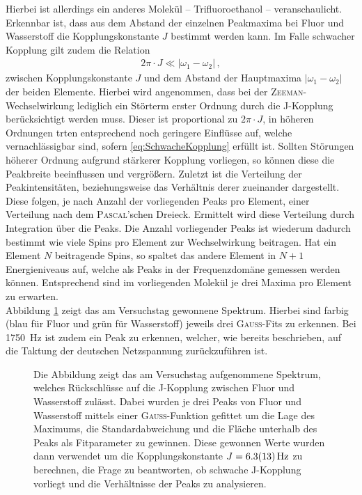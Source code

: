Hierbei ist allerdings ein anderes Molekül -- Trifluoroethanol -- veranschaulicht.
Erkennbar ist, dass aus dem Abstand der einzelnen Peakmaxima bei Fluor und Wasserstoff die Kopplungskonstante $J$ bestimmt werden kann.
Im Falle schwacher Kopplung gilt zudem die Relation
\begin{align}
    2 \pi \cdot J \ll \vert \omega_1 - \omega_2 \vert \, , \label{eq:SchwacheKopplung}
\end{align}
zwischen Kopplungskonstante $J$ und dem Abstand der Hauptmaxima $\vert \omega_1 - \omega_2 \vert$ der beiden Elemente.
Hierbei wird angenommen, dass bei der \textsc{Zeeman}-Wechselwirkung lediglich ein Störterm erster Ordnung durch die J-Kopplung berücksichtigt werden muss.
Dieser ist proportional zu $2 \pi \cdot J$, in höheren Ordnungen trten entsprechend noch geringere Einflüsse auf, welche vernachlässigbar sind, sofern \eqref{eq:SchwacheKopplung} erfüllt ist. 
Sollten Störungen höherer Ordnung aufgrund stärkerer Kopplung vorliegen, so können diese die Peakbreite beeinflussen und vergrößern.
Zuletzt ist die Verteilung der Peakintensitäten, beziehungsweise das Verhältnis derer zueinander dargestellt.
Diese folgen, je nach Anzahl der vorliegenden Peaks pro Element, einer Verteilung nach dem \textsc{Pascal}'schen Dreieck.
Ermittelt wird diese Verteilung durch Integration über die Peaks.
Die Anzahl vorliegender Peaks ist wiederum dadurch bestimmt wie viele Spins pro Element zur Wechselwirkung beitragen.
Hat ein Element $N$ beitragende Spins, so spaltet das andere Element in $N+1$ Energieniveaus auf, welche als Peaks in der Frequenzdomäne gemessen werden können.
Entsprechend sind im vorliegenden Molekül je drei Maxima pro Element zu erwarten. \cite{Schmidt} \\

Abbildung \ref{fig:JKopplungExp} zeigt das am Versuchstag gewonnene Spektrum.
Hierbei sind farbig (blau für Fluor und grün für Wasserstoff) jeweils drei \textsc{Gauss}-Fits zu erkennen. 
Bei \SI{1750}{\hertz} ist zudem ein Peak zu erkennen, welcher, wie bereits beschrieben, auf die Taktung der deutschen Netzspannung zurückzuführen ist.

\begin{figure}[H]
    \centering
    
    \caption[Spektrum zur Analyse der J-Kopplung zwischen Fluor und Wasserstoff.]{Die Abbildung zeigt das am Versuchstag aufgenommene Spektrum, welches Rückschlüsse auf die J-Kopplung zwischen Fluor und Wasserstoff zulässt. 
    Dabei wurden je drei Peaks von Fluor und Wasserstoff mittels einer \textsc{Gauss}-Funktion gefittet um die Lage des Maximums, die Standardabweichung und die Fläche unterhalb des Peaks als Fitparameter zu gewinnen.
    Diese gewonnen Werte wurden dann verwendet um die Kopplungskonstante $J = \SI{6.3 \pm 1.3}{\hertz}$ zu berechnen, die Frage zu beantworten, ob schwache J-Kopplung vorliegt und die Verhältnisse der Peaks zu analysieren.}
    \label{fig:JKopplungExp}
\end{figure}

